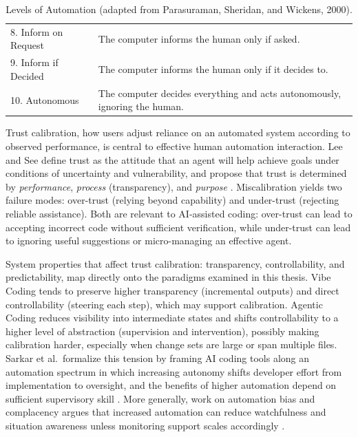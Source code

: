 \begin{table}[ht]
\begin{tabularx}{\textwidth}{p{3.5cm} X}
    8. Inform on Request & The computer informs the human only if asked. \\

    9. Inform if Decided & The computer informs the human only if it decides to. \\

    10. Autonomous & The computer decides everything and acts autonomously, ignoring the human. \\

    \bottomrule

  \end{tabularx}

  \caption{Levels of Automation (adapted from Parasuraman, Sheridan, and Wickens, 2000).}

  \label{tab:levels-of-automation}

\end{table}

Trust calibration, how users adjust reliance on an automated system according to observed performance, is central to effective human automation interaction. Lee and See define trust as the attitude that an agent will help achieve goals under conditions of uncertainty and vulnerability, and propose that trust is determined by \emph{performance}, \emph{process} (transparency), and \emph{purpose} \parencite[pp.~54--62]{leeSee2004trust}. Miscalibration yields two failure modes: over-trust (relying beyond capability) and under-trust (rejecting reliable assistance). Both are relevant to AI-assisted coding: over-trust can lead to accepting incorrect code without sufficient verification, while under-trust can lead to ignoring useful suggestions or micro-managing an effective agent.

System properties that affect trust calibration: transparency, controllability, and predictability, map directly onto the paradigms examined in this thesis. Vibe Coding tends to preserve higher transparency (incremental outputs) and direct controllability (steering each step), which may support calibration. Agentic Coding reduces visibility into intermediate states and shifts controllability to a higher level of abstraction (supervision and intervention), possibly making calibration harder, especially when change sets are large or span multiple files. Sarkar et al.\ formalize this tension by framing AI coding tools along an automation spectrum in which increasing autonomy shifts developer effort from implementation to oversight, and the benefits of higher automation depend on sufficient supervisory skill \parencite{sarkar2025codewithme}. More generally, work on automation bias and complacency argues that increased automation can reduce watchfulness and situation awareness unless monitoring support scales accordingly \parencite{parasuramanManzey2010, endsley1995situation}.

